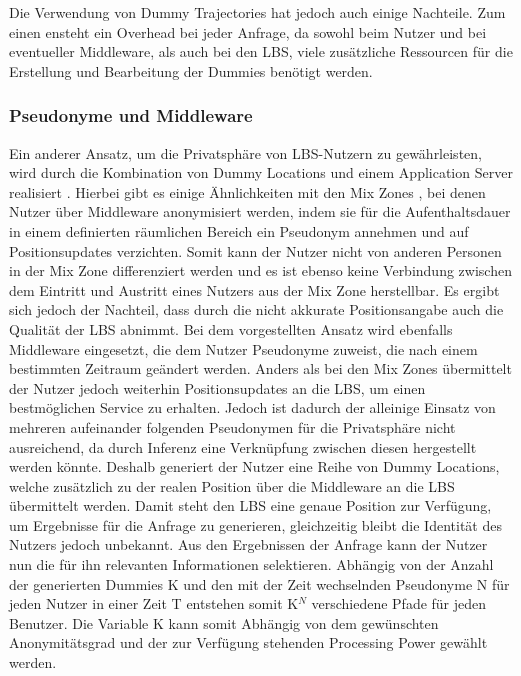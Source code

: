 Die Verwendung von Dummy Trajectories hat jedoch auch einige Nachteile. Zum einen ensteht ein Overhead bei jeder Anfrage, da sowohl beim Nutzer und bei eventueller Middleware, als auch bei den LBS, viele zusätzliche Ressourcen für die Erstellung und Bearbeitung der Dummies benötigt werden.





\subsubsection{Pseudonyme und Middleware}
Ein anderer Ansatz, um die Privatsphäre von LBS-Nutzern zu gewährleisten, wird durch die Kombination von Dummy Locations und einem Application Server realisiert \cite{Sahu2012}. Hierbei gibt es einige Ähnlichkeiten mit den Mix Zones \cite{Beresford2003}, bei denen Nutzer über Middleware anonymisiert werden, indem sie für die Aufenthaltsdauer in einem definierten räumlichen Bereich ein Pseudonym annehmen und auf Positionsupdates verzichten. Somit kann der Nutzer nicht von anderen Personen in der Mix Zone differenziert werden und es ist ebenso keine Verbindung zwischen dem Eintritt und Austritt eines Nutzers aus der Mix Zone herstellbar. Es ergibt sich jedoch der Nachteil, dass durch die nicht akkurate Positionsangabe auch die Qualität der LBS abnimmt. 
Bei dem vorgestellten Ansatz wird ebenfalls Middleware eingesetzt, die dem Nutzer Pseudonyme zuweist, die nach einem bestimmten Zeitraum geändert werden. Anders als bei den Mix Zones übermittelt der Nutzer jedoch weiterhin Positionsupdates an die LBS, um einen bestmöglichen Service zu erhalten. Jedoch ist dadurch der alleinige Einsatz von mehreren aufeinander folgenden Pseudonymen für die Privatsphäre nicht ausreichend, da durch Inferenz eine Verknüpfung zwischen diesen hergestellt werden könnte. Deshalb generiert der Nutzer eine Reihe von Dummy Locations, welche zusätzlich zu der realen Position über die Middleware an die LBS übermittelt werden. Damit steht den LBS eine genaue Position zur Verfügung, um Ergebnisse für die Anfrage zu generieren, gleichzeitig bleibt die Identität des Nutzers jedoch unbekannt. Aus den Ergebnissen der Anfrage kann der Nutzer nun die für ihn relevanten Informationen selektieren.
Abhängig von der Anzahl der generierten Dummies K und den mit der Zeit wechselnden Pseudonyme N für jeden Nutzer in einer Zeit T entstehen somit K$^{N}$ verschiedene Pfade für jeden Benutzer. Die Variable K kann somit Abhängig von dem gewünschten Anonymitätsgrad und der zur Verfügung stehenden Processing Power gewählt werden.

